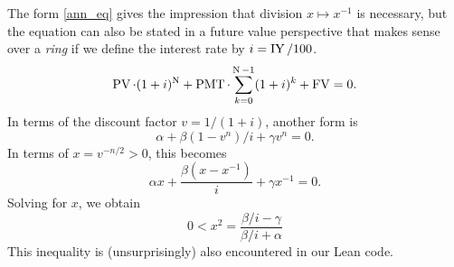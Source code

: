 The form \eqref{ann_eq} gives the impression that division $x \mapsto x^{-1}$ is necessary, but the equation can also be stated in a future value perspective that makes sense over a \emph{ring} if we define the interest rate by $i=\operatorname{IY}/100$.
\[
\operatorname{PV}\cdot (1 + i)^{\operatorname{N}} + \operatorname{PMT}\cdot \sum_{k=0}^{\operatorname{N}-1} (1 +i)^{k} + \operatorname{FV} = 0.
\]
In terms of the discount factor $v=1/(1+i)$, another form is
\[
\alpha + \beta (1-v^n)/i + \gamma v^n = 0.
\]
In terms of $x=v^{-n/2}>0$, this becomes
\[
\alpha x + \frac{\beta (x-x^{-1})}i + \gamma x^{-1} = 0.
\]
Solving for $x$, we obtain
\[
0 < x^2 = \frac{\beta/i-\gamma}{\beta/i+\alpha}
\]
This inequality is (unsurprisingly) also encountered in our Lean code.

